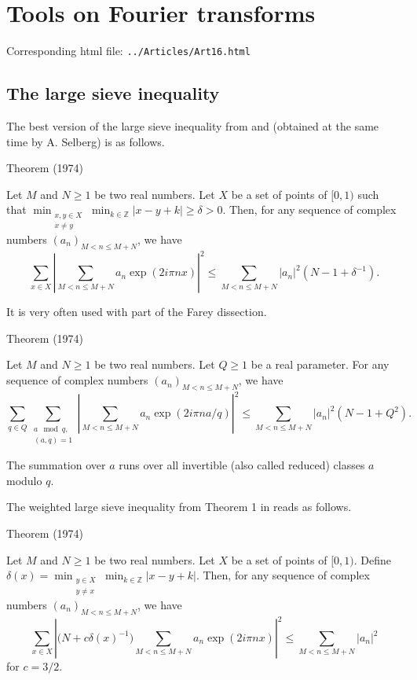 \chapter{  Tools on Fourier transforms}

Corresponding html file: \texttt{../Articles/Art16.html}










\section{The large sieve inequality}


The best version of the large sieve inequality from
\cite{Montgomery-Vaughan*74}
and
\cite{Montgomery-Vaughan*73}
(obtained at the same time by A. Selberg) is as follows.
\par 
\begin{thm}{Theorem (1974)}

Let $M$ and $N\ge 1$ be two real numbers. Let $X$ be a set of points of
$[0,1)$ such that 
$
\displaystyle
\min_{\substack{x,y\in X\\ x\neq y}}
\min_{k\in\mathbb{Z}}|x-y+k|\ge \delta>0.
$
Then, for any sequence of complex numbers $(a_n)_{M < n\le M+N}$, we have
$$
\sum_{x\in X}\left|
\sum_{M < n\le M+N} a_n \exp(2i\pi nx)
\right|^2
\le \sum_{M < n\le M+N}|a_n|^2 (N-1+\delta^{-1}).
$$
\end{thm}


It is very often used with part of the Farey dissection.
\par 
\begin{thm}{Theorem (1974)}

Let $M$ and $N\ge 1$ be two real numbers. Let $Q\ge1$ be a real parameter.
For any sequence of complex numbers $(a_n)_{M < n\le M+N}$, we have
$$
\sum_{q\in Q}\sum_{\substack{a\mod q,\\ (a,q)=1}}\left|
\sum_{M < n\le M+N} a_n \exp(2i\pi na/q)
\right|^2
\le \sum_{M < n\le M+N}|a_n|^2 (N-1+Q^2).
$$
\end{thm}

The summation over $a$ runs over all invertible (also called reduced)
classes $a$ modulo $q$.

The weighted large sieve inequality from Theorem 1 in
\cite{Montgomery-Vaughan*74}
reads as follows.
\par 
\begin{thm}{Theorem (1974)}

Let $M$ and $N\ge 1$ be two real numbers. Let $X$ be a set of points of
$[0,1)$. Define
$
\displaystyle
\delta(x)=\min_{\substack{y\in X\\ y\neq x}}
\min_{k\in\mathbb{Z}}|x-y+k|.
$
Then, for any sequence of complex numbers $(a_n)_{M < n\le M+N}$, we have
$$
\sum_{x\in X}\left|
\bigl(N+c\delta(x)^{-1}\bigr)\sum_{M < n\le M+N} a_n \exp(2i\pi nx)
\right|^2
\le \sum_{M < n\le M+N}|a_n|^2
	      $$
	      for $c=3/2$.
\end{thm}

